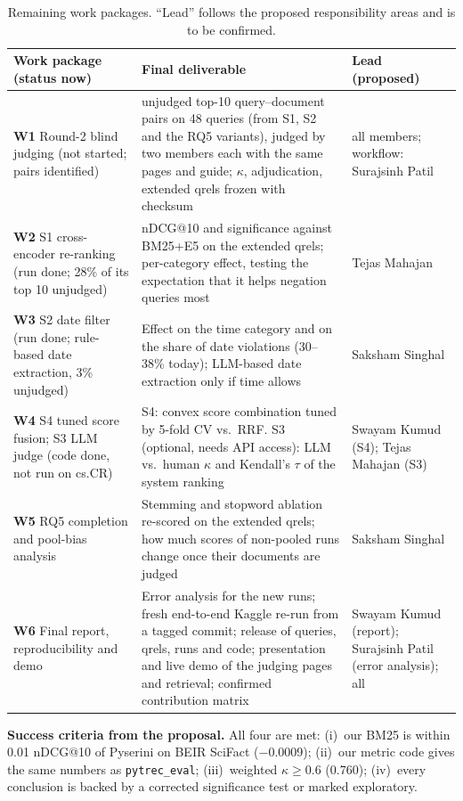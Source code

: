\documentclass[10pt,a4paper]{article}
\renewcommand{\arraystretch}{1.08}
\begin{document}
\begin{table}[H]\centering\small
\caption{Remaining work packages. ``Lead'' follows the proposed responsibility areas and is to be confirmed.}\label{tab:plan}
\renewcommand{\arraystretch}{1.25}
\begin{tabularx}{\linewidth}{@{}>{\raggedright\arraybackslash}p{3.6cm} >{\raggedright\arraybackslash}X >{\raggedright\arraybackslash}p{2.3cm}@{}}
\toprule
Work package (status now) & Final deliverable & Lead (proposed)\\
\midrule
\textbf{W1} Round-2 blind judging (not started; pairs identified) & 272 unjudged top-10 query--document pairs on 48 queries (from S1, S2 and the RQ5 variants), judged by two members each with the same pages and guide; $\kappa$, adjudication, extended qrels frozen with checksum & all members; workflow: Surajsinh Patil\\
\textbf{W2} S1 cross-encoder re-ranking (run done; 28\% of its top 10 unjudged) & nDCG@10 and significance against BM25+E5 on the extended qrels; per-category effect, testing the expectation that it helps negation queries most & Tejas Mahajan\\
\textbf{W3} S2 date filter (run done; rule-based date extraction, 3\% unjudged) & Effect on the time category and on the share of date violations (30--38\% today); LLM-based date extraction only if time allows & Saksham Singhal\\
\textbf{W4} S4 tuned score fusion; S3 LLM judge (code done, not run on cs.CR) & S4: convex score combination tuned by 5-fold CV vs.\ RRF. S3 (optional, needs API access): LLM vs.\ human $\kappa$ and Kendall's $\tau$ of the system ranking & Swayam Kumud (S4); Tejas Mahajan (S3)\\
\textbf{W5} RQ5 completion and pool-bias analysis & Stemming and stopword ablation re-scored on the extended qrels; how much scores of non-pooled runs change once their documents are judged & Saksham Singhal\\
\textbf{W6} Final report, reproducibility and demo & Error analysis for the new runs; fresh end-to-end Kaggle re-run from a tagged commit; release of queries, qrels, runs and code; presentation and live demo of the judging pages and retrieval; confirmed contribution matrix & Swayam Kumud (report); Surajsinh Patil (error analysis); all\\
\bottomrule
\end{tabularx}
\end{table}

\textbf{Success criteria from the proposal.} All four are met: (i)~our BM25 is within 0.01 nDCG@10 of Pyserini on
BEIR SciFact ($-$0.0009); (ii)~our metric code gives the same numbers as \texttt{pytrec\_eval}; (iii)~weighted
$\kappa\ge0.6$ (0.760); (iv)~every conclusion is backed by a corrected significance test or marked exploratory.
\end{document}
